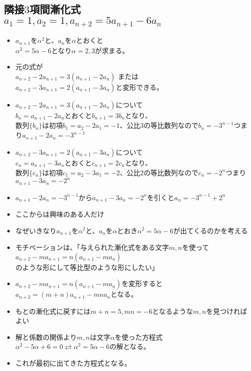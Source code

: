 \documentclass[twocolumn, 25pt]{jarticle}
\begin{document}
\subsection{隣接$3$項間漸化式\\ $a_1 = 1,a_2 = 1, a_{n + 2} = 5a_{n + 1} -6 a_n $}
\begin{itemize}
  \item $a_{n + 1}$を${\alpha}^2$と、$a_{n}$を${\alpha}$とおくと\\ ${\alpha}^2 = 5\alpha - 6$となり$\alpha = 2, 3$が求まる。
  \item 元の式が\\ $a_{n + 2} -2a_{n + 1} = 3(a_{n + 1} -2a_n)$ または\\$a_{n + 2} -3a_{n + 1} = 2(a_{n + 1} -3a_n)$と変形できる。
  \item $a_{n + 2} -2a_{n + 1} = 3(a_{n + 1} -2a_n)$について\\ $ b_ n =a_{n + 1} -2a_n$とおくと$b_{n + 1} = 3b_n$となり、\\ 数列$\{b_n\}$は初項$b_1 = a_2 - 2a_1=-1$、公比$3$の等比数列なので$b_n = -3^{n - 1}$つまり$a_{n + 1} -2a_n = -3^{n - 1}$
  \item $a_{n + 2} -3a_{n + 1} = 2(a_{n + 1} -3a_n)$について\\ $ c_ n =a_{n + 1} -3a_n$とおくと$c_{n + 1} = 2c_n$となり、\\ 数列$\{c_n\}$は初項$c_1 = a_2 - 3a_1=-2$、公比$2$の等比数列なので$c_n = -2^{n}$つまり$a_{n + 1} -3a_n = -2^{n}$
  \item $a_{n + 1} -2a_n = -3^{n - 1}$から$a_{n + 1} -3a_n = -2^{n}$を引くと$a_n = -3^{n - 1} + 2^n$
  \item ここからは興味のある人だけ
  \item なぜいきなり$a_{n + 1}$を${\alpha}^2$と、$a_{n}$を${\alpha}$とおき${\alpha}^2 = 5\alpha - 6$が出てくるのかを考える
  \item モチベーションは、「与えられた漸化式をある文字$m, n$を使って\\ $a_{n + 2} -ma_{n + 1} = n(a_{n + 1} -ma_n)$\\ のような形にして等比型のような形にしたい」
  \item $a_{n + 2} -ma_{n + 1} = n(a_{n + 1} -ma_n)$を変形すると$a_{n + 2} = (m + n)a_{n + 1} - mna_n$となる。
  \item もとの漸化式に戻すには$m + n = 5,mn = -6$となるような$m, n$を見つければよい
  \item 解と係数の関係より$m, n$は文字$\alpha$を使った方程式${\alpha}^2 - 5\alpha  + 6= 0 \rightleftarrows {\alpha}^2 = 5\alpha  - 6$の解となる。
  \item これが最初に出てきた方程式となる。
\end{itemize}
\end{document}
